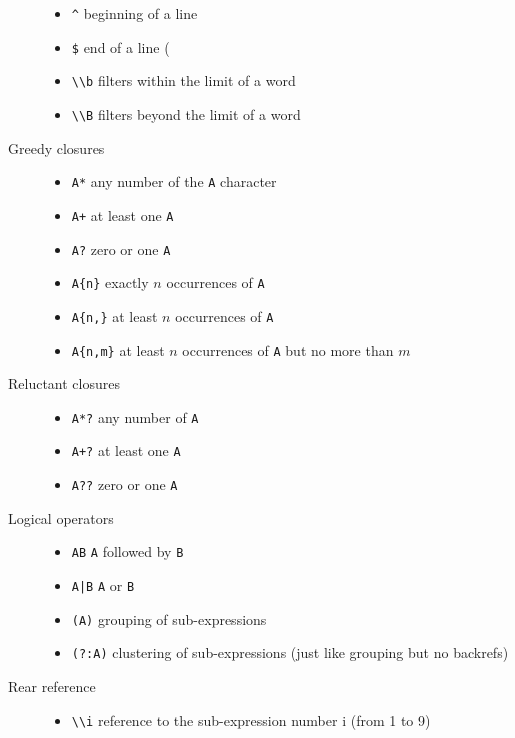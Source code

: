 \begin{description}
\begin{itemize}
    \item \verb!^!         beginning of a line
    \item \verb!$!         end of a line (%
    \item \verb!\\b!       filters within the limit of a word
    \item \verb!\\B!       filters beyond the limit of a word
    \end{itemize}
\item[Greedy closures] %
    \mbox{}\begin{itemize}
    \item \verb!A*!        any number of the \verb!A! character
    \item \verb!A+!        at least one \verb!A!
    \item \verb!A?!        zero or one \verb!A!
    \item \verb!A{n}!      exactly $n$ occurrences of \verb!A!
    \item \verb!A{n,}!     at least $n$ occurrences of \verb!A!
    \item \verb!A{n,m}!    at least $n$ occurrences of \verb!A! but no more than
    $m$
    \end{itemize}
\item[Reluctant closures]
    \mbox{}\begin{itemize}
    \item \verb!A*?!        any number of \verb!A!
    \item \verb!A+?!        at least one \verb!A!
    \item \verb!A??!        zero or one \verb!A!
    \end{itemize}
\item[Logical operators]
    \mbox{}\begin{itemize}
    \item \verb!AB!        \verb!A! followed by \verb!B!
    \item \verb!A|B!       \verb!A! or \verb!B!
    \item \verb!(A)!       grouping of sub-expressions
    \item \verb!(?:A)!     clustering of sub-expressions (just like grouping but no backrefs)
    \end{itemize}
\item[Rear reference]
    \mbox{}\begin{itemize}
    \item \verb!\\i! reference to the sub-expression number i (from 1 to 9)
    \end{itemize}
\end{description}

